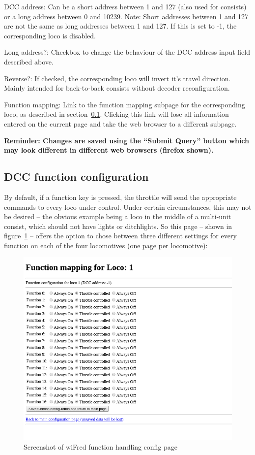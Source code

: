 \documentclass[11pt,a4paper]{scrartcl}
\begin{document}
\begin{description}
\item{DCC address:} Can be a short address between 1 and 127 (also used for consists) or a long address between 0 and 10239. Note: Short addresses between 1 and 127 are not the same as long addresses between 1 and 127. If this is set to -1, the corresponding loco is disabled.
\item{Long address?:} Checkbox to change the behaviour of the DCC address input field described above.
\item{Reverse?:} If checked, the corresponding loco will invert it's travel direction. Mainly intended for back-to-back consists without decoder reconfiguration.
\item{Function mapping:} Link to the function mapping subpage for the corresponding loco, as described in section~\ref{throttle_FunctionConf}. Clicking this link will lose all information entered on the current page and take the web browser to a different subpage.
\end{description}

\textbf{Reminder: Changes are saved using the ``Submit Query'' button which may look different in different web browsers (firefox shown).}

\subsection{DCC function configuration} \label{throttle_FunctionConf}

By default, if a function key is pressed, the throttle will send the appropriate commands to every loco under control. Under certain circumstances, this may not be desired -- the obvious example being a loco in the middle of a multi-unit consist, which should not have lights or ditchlights. So this page -- shown in figure~\ref{throttleConfigFunctionPage} -- offers the option to chose between three different settings for every function on each of the four locomotives (one page per locomotive):

\begin{figure}[tbhp]
  \centering
  \includegraphics[width=0.8 \textwidth]{images/wiFred_function_page}
  \caption{Screenshot of wiFred function handling config page}
  \label{throttleConfigFunctionPage}
\end{figure}
\end{document}
